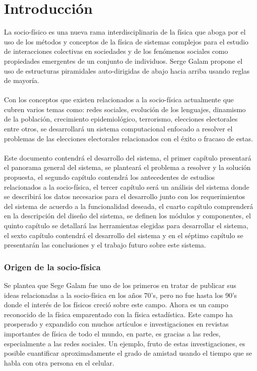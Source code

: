 \newpage 
\chapter*{Introducción}
La socio-físico es una nueva rama interdisciplinaria de la física que aboga por el uso de los métodos y conceptos de la física de sistemas complejos para el estudio de interacciones colectivas en sociedades y de los fenómenos sociales como propiedades emergentes de un conjunto de individuos. Serge Galam propone el uso de estructuras piramidales auto-dirigidas de abajo hacia arriba usando reglas de mayoría. \cite{MarioH.RamirezDiaz2014, Galam.1986, Galam1990, Galam1991, Galam2000}
\\
\\
Con los conceptos que existen relacionados a la socio-física actualmente que cubren varios temas como: redes sociales, evolución de los lenguajes, dinamismo de la población, crecimiento epidemiológico, terrorismo, elecciones electorales entre otros, se desarrollará un sistema computacional enfocado a resolver el problemas de las elecciones electorales relacionados con el éxito o fracaso de estas.
\\
\\
Este documento contendrá el desarrollo del sistema, el primer capítulo presentará el panorama general del sistema, se planteará el problema a resolver y la solución propuesta, el segundo capítulo contendrá los antecedentes de estudios relacionados a la socio-física, el tercer capítulo será un análisis del sistema donde se describirá los datos necesarios para el desarrollo junto con los requerimientos del sistema de acuerdo a la funcionalidad deseada, el cuarto capítulo comprenderá en la descripción del diseño del sistema, se definen los módulos y componentes, el quinto capítulo se detallará las herramientas elegidas para desarrollar el sistema, el sexto capítulo contendrá el desarrollo del sistema y en el séptimo capítulo se presentarán las conclusiones y el trabajo futuro sobre este sistema. 

\subsection*{Origen de la socio-física}
Se plantea que Sege Galam fue uno de los primeros en tratar de publicar sus ideas relacionadas a la socio-física en los años 70's, pero no fue hasta los 90's donde el interés de los físicos creció sobre este campo. Ahora es un campo reconocido de la física emparentado con la física estadística. Este campo ha prosperado y expandido con muchos artículos e investigaciones en revistas importantes de física de todo el mundo, en parte, es gracias a las redes, especialmente a las redes sociales.\cite{Galam.1986} Un ejemplo, fruto de estas investigaciones, es posible cuantificar aproximadamente el grado de amistad usando el tiempo que se habla con otra persona en el celular.\cite{OctavioMiramontes2013}

